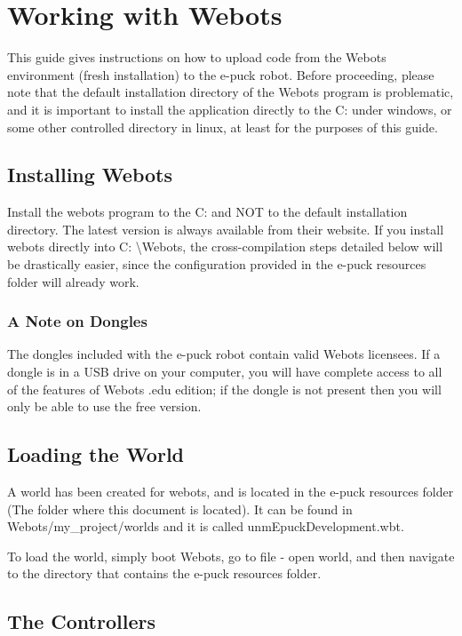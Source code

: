\documentclass[11pt]{article} %
\begin{document}
\section{Working with Webots}

This guide gives instructions on how to upload code from the Webots environment (fresh installation) to the e-puck robot.  Before proceeding, please note that the default installation directory of the Webots program is problematic, and it is important to install the application directly to the C: under windows, or some other controlled directory in linux, at least for the purposes of this guide.

\subsection{Installing Webots}

Install the webots program to the C: and NOT to the default installation directory.  The latest version is always available from their website.  If you install webots directly into C: \textbackslash Webots, the cross-compilation steps detailed below will be drastically easier, since the configuration provided in the e-puck resources folder will already work.

\subsubsection{A Note on Dongles}

The dongles included with the e-puck robot contain valid Webots licensees.  If a dongle is in a USB drive on your computer, you will have complete access to all of the features of Webots .edu edition; if the dongle is not present then you will only be able to use the free version.

\subsection{Loading the World}

A world has been created for webots, and is located in the e-puck resources folder (The folder where this document is located).  It can be found in Webots/my\_project/worlds and it is called unmEpuckDevelopment.wbt.

To load the world, simply boot Webots, go to file - open world, and then navigate to the directory that contains the e-puck resources folder.

\subsection{The Controllers}
\end{document}
